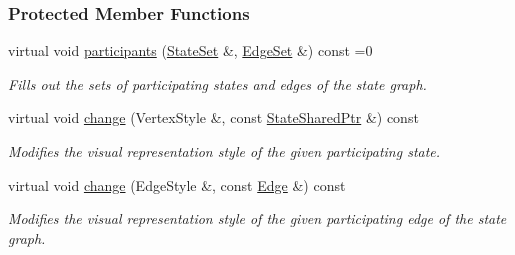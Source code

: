 \subsubsection*{Protected Member Functions}
\begin{DoxyCompactItemize}
\item 
virtual void \hyperlink{structslb_1_1ext_1_1event_1_1UniformChange_aa9f313a6c9ba9a72796286131ab0dde8}{participants} (\hyperlink{structslb_1_1ext_1_1event_1_1UniformChange_a2c45514041ea86f77bbd0147fe06babd}{State\+Set} \&, \hyperlink{structslb_1_1ext_1_1event_1_1UniformChange_af17825d303d567061f2d510f231d556c}{Edge\+Set} \&) const =0\hypertarget{structslb_1_1ext_1_1event_1_1UniformChange_aa9f313a6c9ba9a72796286131ab0dde8}{}\label{structslb_1_1ext_1_1event_1_1UniformChange_aa9f313a6c9ba9a72796286131ab0dde8}

\begin{DoxyCompactList}\small\item\em Fills out the sets of participating states and edges of the state graph. \end{DoxyCompactList}\item 
virtual void \hyperlink{structslb_1_1ext_1_1event_1_1UniformChange_aa5c584fe29302b56be14d9c1efd78f8f}{change} (Vertex\+Style \&, const \hyperlink{structslb_1_1ext_1_1event_1_1UniformChange_a2e6e9605dcd4df428c03c7637fd0d20d}{State\+Shared\+Ptr} \&) const \hypertarget{structslb_1_1ext_1_1event_1_1UniformChange_aa5c584fe29302b56be14d9c1efd78f8f}{}\label{structslb_1_1ext_1_1event_1_1UniformChange_aa5c584fe29302b56be14d9c1efd78f8f}

\begin{DoxyCompactList}\small\item\em Modifies the visual representation style of the given participating state. \end{DoxyCompactList}\item 
virtual void \hyperlink{structslb_1_1ext_1_1event_1_1UniformChange_a222c517a6d6dba81aa82fefeb851d057}{change} (Edge\+Style \&, const \hyperlink{structslb_1_1ext_1_1event_1_1UniformChange_a7ea26ff1c10c84d9bd6002bf5f175f22}{Edge} \&) const \hypertarget{structslb_1_1ext_1_1event_1_1UniformChange_a222c517a6d6dba81aa82fefeb851d057}{}\label{structslb_1_1ext_1_1event_1_1UniformChange_a222c517a6d6dba81aa82fefeb851d057}

\begin{DoxyCompactList}\small\item\em Modifies the visual representation style of the given participating edge of the state graph. \end{DoxyCompactList}\end{DoxyCompactItemize}


